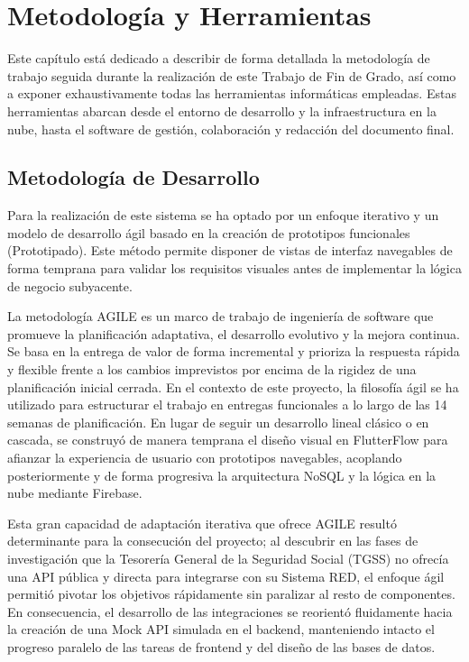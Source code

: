 \chapter{Metodología y Herramientas} \label{chp:metodos-herramientas}

Este capítulo está dedicado a describir de forma detallada la metodología de trabajo seguida durante la realización de este Trabajo de Fin de Grado, así como a exponer exhaustivamente todas las herramientas informáticas empleadas. Estas herramientas abarcan desde el entorno de desarrollo y la infraestructura en la nube, hasta el software de gestión, colaboración y redacción del documento final.


\section{Metodología de Desarrollo} \label{sct:metodologia}

Para la realización de este sistema se ha optado por un enfoque iterativo y un modelo de desarrollo ágil basado en la creación de prototipos funcionales (Prototipado). Este método permite disponer de vistas de interfaz navegables de forma temprana para validar los requisitos visuales antes de implementar la lógica de negocio subyacente. 

La metodología AGILE es un marco de trabajo de ingeniería de software que promueve la planificación adaptativa, el desarrollo evolutivo y la mejora continua. Se basa en la entrega de valor de forma incremental y prioriza la respuesta rápida y flexible frente a los cambios imprevistos por encima de la rigidez de una planificación inicial cerrada. En el contexto de este proyecto, la filosofía ágil se ha utilizado para estructurar el trabajo en entregas funcionales a lo largo de las 14 semanas de planificación. En lugar de seguir un desarrollo lineal clásico o en cascada, se construyó de manera temprana el diseño visual en FlutterFlow para afianzar la experiencia de usuario con prototipos navegables, acoplando posteriormente y de forma progresiva la arquitectura NoSQL y la lógica en la nube mediante Firebase. 

Esta gran capacidad de adaptación iterativa que ofrece AGILE resultó determinante para la consecución del proyecto; al descubrir en las fases de investigación que la Tesorería General de la Seguridad Social (TGSS) no ofrecía una API pública y directa para integrarse con su Sistema RED, el enfoque ágil permitió pivotar los objetivos rápidamente sin paralizar al resto de componentes. En consecuencia, el desarrollo de las integraciones se reorientó fluidamente hacia la creación de una Mock API simulada en el backend, manteniendo intacto el progreso paralelo de las tareas de frontend y del diseño de las bases de datos.

